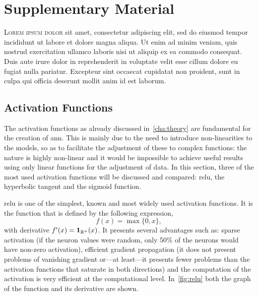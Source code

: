 

\chapter{Supplementary Material}\label{cha:extra}



\lettrine{L}{orem ipsum dolor} sit amet, consectetur adipiscing elit, sed do
eiusmod tempor incididunt ut labore et dolore magna aliqua. Ut enim ad minim
veniam, quis nostrud exercitation ullamco laboris nisi ut aliquip ex ea commodo
consequat. Duis aute irure dolor in reprehenderit in voluptate velit esse
cillum dolore eu fugiat nulla pariatur. Excepteur sint occaecat cupidatat non
proident, sunt in culpa qui officia deserunt mollit anim id est laborum.



\section{Activation Functions}%
\label{sec:activation}

The activation functions as already discussed in\ \vref{cha:theory} are
fundamental for the creation of \gls{ann}. This is mainly due to the need to
introduce non-linearities to the models, so as to facilitate the adjustment of
these to complex functions: the nature is highly non-linear and it would be
impossible to achieve useful results using only linear functions for the
adjustment of data. In this section, three of the most used activation
functions will be discussed and compared: \gls{relu}, the hyperbolic
tangent and the sigmoid function.

\gls{relu} is one of the simplest, known and most widely used activation
functions. It is the function that is defined by the following expression,
\begin{equation}
  f(x) = \max\{0, x\},
\end{equation}
with derivative \(f^\prime(x) = \mathbf{1}_{\mathbb{R}^+}(x)\). It presents several
advantages such as: sparse activation (if the neuron values were random, only
50\% of the neurons would have non-zero activation), efficient gradient
propagation (it does not present problems of vanishing gradient or---at
least---it presents fewer problems than the activation functions that saturate
in both directions) and the computation of the activation is very efficient at
the computational level. In\ \vref{fig:relu} both the graph of the function and
its derivative are shown.

